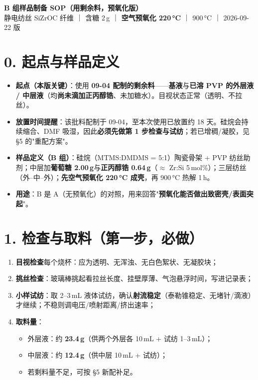 \documentclass[a4paper, 11pt]{ctexart}
\begin{document}
\begin{center}
{\LARGE\bfseries B 组样品制备 SOP（用剩余料，预氧化版）}\\[4pt]
{\normalsize 静电纺丝 SiZrOC 纤维 ｜ 含糖 2\,g ｜ \textbf{空气预氧化 220\,°C} ｜  900\,°C ｜ 2026-09-22 版}
\end{center}

\section*{0. 起点与样品定义}
\begin{itemize}
  \item \textbf{起点（本版关键）}：使用 \textbf{09-04 配制的剩余料}——\textbf{基液}与\textbf{已溶 PVP 的外层液 / 中层液}（均\textbf{尚未滴加正丙醇锆}、未加糖水）。目视状态正常（透明、不拉丝）。
  \item \textbf{放置时间提醒}：该批料配制于 09-04，至本次使用已放置约 18 天。硅烷会持续缩合、DMF 吸湿，因此\textbf{必须先做第 1 步检查与试纺}；若已增稠/凝胶，见 §5 的"重配方案"。
  \item \textbf{样品定义（B 组）}：硅烷（MTMS:DMDMS = 5:1）陶瓷骨架 + PVP 纺丝助剂；中层加\textbf{葡萄糖 2.00\,g}与\textbf{正丙醇锆 0.64\,g}（$\approx$ Zr:Si 5\,mol\%）；三层纺丝（外--中--外）；\textbf{先空气预氧化 220\,°C 成壳}，再  900\,°C 热解 1\,h。
  \item \textbf{用途}：B 是 A（无预氧化）的对照，用来回答"\textbf{预氧化能否做出致密壳/表面突起}"。
\end{itemize}

\section*{1. 检查与取料（第一步，必做）}
\begin{enumerate}
  \item \textbf{目视检查}每个烧杯：应为透明、无浑浊、无白色絮状、无凝胶块；
  \item \textbf{挑丝检查}：玻璃棒挑起看拉丝长度、挂壁厚薄、气泡悬浮时间，写进记录表；
  \item \textbf{小样试纺}：取 2--3\,mL 液体试纺，确认\textbf{射流稳定}（泰勒锥稳定、无堵针/滴液）才继续；不稳则调电压/喷射距离/挤出速率；
  \item \textbf{取料量}：
    \begin{itemize}
      \item 外层液：约 \textbf{23.4\,g}（供两个外层各 10\,mL + 试纺 1--3\,mL）；
      \item 中层液：约 \textbf{12.4\,g}（供中层 10\,mL + 试纺）；
      \item 若剩料量不足，可按 §5 新配补足。
    \end{itemize}
\end{enumerate}
\end{document}
